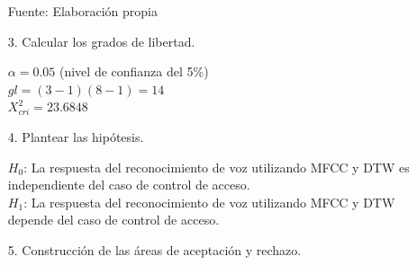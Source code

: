 \begin{enumerate}
\begin{center}
\begin{table}[H]
\centering
\caption{\small{Tabla de frecuencias esperadas.}}
\label{table:tabla4.36}
\vskip 0.2cm
\begin{center}
\vskip 0.2cm
{\small{Fuente: Elaboración propia}}
\end{center}
\end{table}
\end{center}

\item[3.] Calcular los grados de libertad.
\par
$\alpha = 0.05$ (nivel de confianza del 5\%) \\
$gl = (3-1)(8-1) = 14$ \\
$X^{2}_{cri} = 23.6848$ 

\item[4.]Plantear las hipótesis.
\par
$H_{0}$: La respuesta del reconocimiento de voz utilizando MFCC y DTW es independiente del caso de control de acceso. \\
$H_{1}$: La respuesta del reconocimiento de voz utilizando MFCC y DTW depende del caso de control de acceso.

\item[5.] Construcción de las áreas de aceptación y rechazo.


\end{enumerate}
